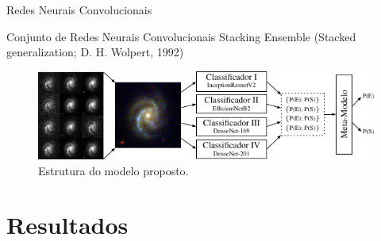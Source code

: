 \documentclass[10pt,xcolor=svgnames]{beamer}
\begin{document}
\begin{frame}{Redes Neurais Convolucionais}
\begin{figure}
\end{figure}
\end{frame}

\begin{frame}{Conjunto de Redes Neurais Convolucionais}
  Stacking Ensemble (Stacked generalization; D. H. Wolpert, 1992)
  \vspace{2mm}

  \begin{figure}
    \includegraphics[width=\linewidth]{figures/arch.pdf}
    \caption{Estrutura do modelo proposto.}
  \end{figure}
\end{frame}


{
\AtBeginSection{}
\section{Resultados}
}
\end{document}
